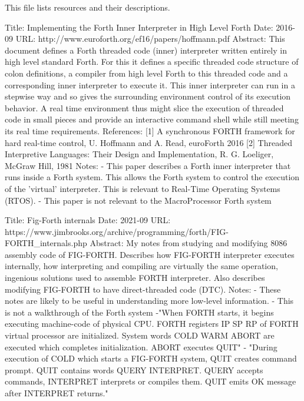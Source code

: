 \documentclass[
    letterpaper, %
	fontsize=10pt, %
	twoside=true, %
	numbers=noenddot, %
]{kaobook}
\begin{document}
\printbibliography[heading=bibintoc, title=Bibliography, prenote=bibnote] %

This file lists resources and their descriptions.

Title:  Implementing the Forth Inner Interpreter in High Level Forth
Date:  2016-09
URL:  http://www.euroforth.org/ef16/papers/hoffmann.pdf
Abstract:  This document defines a Forth threaded code (inner) interpreter written entirely in
    high level standard Forth. For this it defines a specific threaded code structure of colon
    definitions, a compiler from high level Forth to this threaded code and a corresponding
    inner interpreter to execute it. This inner interpreter can run in a stepwise way and so gives
    the surrounding environment control of its execution behavior. A real time environment
    thus might slice the execution of threaded code in small pieces and provide an interactive
    command shell while still meeting its real time requirements.
References:
    [1] A synchronous FORTH framework for hard real-time control, U. Hoffmann and A. Read, euroForth 2016
    [2] Threaded Interpretive Languages: Their Design and Implementation, R. G. Loeliger, McGraw Hill, 1981
Notes:
   - This paper describes a Forth inner interpreter that runs inside a Forth system. This allows
   the Forth system to control the execution of the 'virtual' interpreter. This is relevant
   to Real-Time Operating Systems (RTOS).
   - This paper is not relevant to the MacroProcessor Forth system

Title:  Fig-Forth internals
Date: 2021-09
URL:  https://www.jimbrooks.org/archive/programming/forth/FIG-FORTH\_internals.php
Abstract:  My notes from studying and modifying 8086 assembly code of FIG-FORTH. Describes
    how FIG-FORTH interpreter executes internally, how interpreting and compiling are virtually 
    the same operation, ingenious solutions used to assemble FORTH interpreter. Also describes 
    modifying FIG-FORTH to have direct-threaded code (DTC). 
Notes:
    - These notes are likely to be useful in understanding more low-level information.
    - This is not a walkthrough of the Forth system
    -"When FORTH starts, it begins executing machine-code of physical CPU. FORTH registers 
    IP SP RP of FORTH virtual processor are initialized. System words COLD WARM ABORT are 
    executed which completes initialization. ABORT executes QUIT"
    - "During execution of COLD which starts a FIG-FORTH system, QUIT creates command 
    prompt. QUIT contains words QUERY INTERPRET. QUERY accepts commands, INTERPRET 
    interprets or compiles them. QUIT emits OK message after INTERPRET returns."
\end{document}
